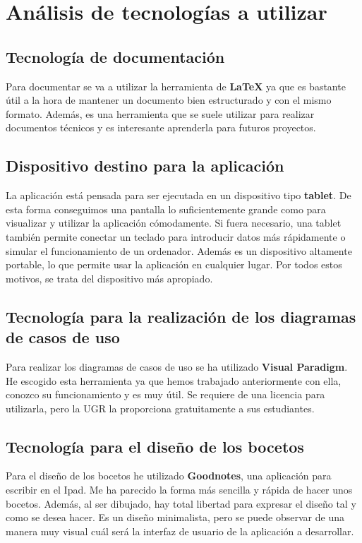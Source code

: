 \chapter{Análisis de tecnologías a utilizar}
\label{chap:Technologies}

\section{Tecnología de documentación}

Para documentar se va a utilizar la herramienta de \textbf{LaTeX} ya que es bastante útil a la hora de mantener un documento bien estructurado y con el mismo formato. Además, es una herramienta que se suele utilizar para realizar documentos técnicos y es interesante aprenderla para futuros proyectos.  

\section{Dispositivo destino para la aplicación}

La aplicación está pensada para ser ejecutada en un dispositivo tipo \textbf{tablet}. De esta forma conseguimos una pantalla lo suficientemente grande como para visualizar y utilizar la aplicación cómodamente. Si fuera necesario, una tablet también permite conectar un teclado para introducir datos más rápidamente o simular el funcionamiento de un ordenador. Además es un dispositivo altamente portable, lo que permite usar la aplicación en cualquier lugar. Por todos estos motivos, se trata del dispositivo más apropiado. 

\section{Tecnología para la realización de los diagramas de casos de uso}

Para realizar los diagramas de casos de uso se ha utilizado \textbf{Visual Paradigm}. He escogido esta herramienta ya que hemos trabajado anteriormente con ella, conozco su funcionamiento y es muy útil. Se requiere de una licencia para utilizarla, pero la UGR la proporciona gratuitamente a sus estudiantes. 



\section{Tecnología para el diseño de los bocetos}

Para el diseño de los bocetos he utilizado \textbf{Goodnotes}, una aplicación para escribir en el Ipad. Me ha parecido la forma más sencilla y rápida de hacer unos bocetos. Además, al ser dibujado, hay total libertad para expresar el diseño tal y como se desea hacer. Es un diseño minimalista, pero se puede observar de una manera muy visual cuál será la interfaz de usuario de la aplicación a desarrollar. 


